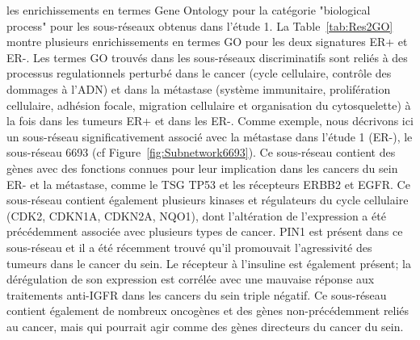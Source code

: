 			 les enrichissements en termes Gene Ontology pour la catégorie "biological process" pour les sous-réseaux obtenus dans l'étude 1.
			La Table~\ref{tab:Res2GO} montre plusieurs enrichissements en termes \acs{GO} pour les deux signatures ER+ et ER-.
			Les termes \acs{GO} trouvés dans les sous-réseaux discriminatifs sont reliés à des processus regulationnels perturbé dans le cancer (cycle cellulaire, contrôle des dommages à l'ADN) et dans la métastase (système immunitaire, prolifération cellulaire, adhésion focale, migration cellulaire et organisation du cytosquelette) à la fois dans les tumeurs ER+ et dans les ER-. 
			Comme exemple, nous décrivons ici un sous-réseau significativement associé avec la métastase dans l'étude 1 (ER-), le sous-réseau 6693 (cf Figure~\ref{fig:Subnetwork6693}).
			Ce sous-réseau contient des gènes avec des fonctions connues pour leur implication dans les cancers du sein ER- et la métastase, comme le \acs{TSG} \acs{TP53} et les récepteurs \acs{ERBB2} et \acs{EGFR}.
			Ce sous-réseau contient également plusieurs kinases et régulateurs du cycle cellulaire (\acs{CDK2}, \acs{CDKN1A}, \acs{CDKN2A}, \acs{NQO1}), dont l'altération de l'expression a été précédemment associée avec plusieurs types de cancer.
			\acs{PIN1} est présent dans ce sous-réseau et il a été récemment trouvé qu'il promouvait l'agressivité des tumeurs dans le cancer du sein.
			Le récepteur à l'insuline est également présent; la dérégulation de son expression est corrélée avec une mauvaise réponse aux traitements anti-\acs{IGFR} dans les cancers du sein triple négatif.
			Ce sous-réseau contient également de nombreux oncogènes et des gènes non-précédemment reliés au cancer, mais qui pourrait agir comme des gènes directeurs du cancer du sein.

